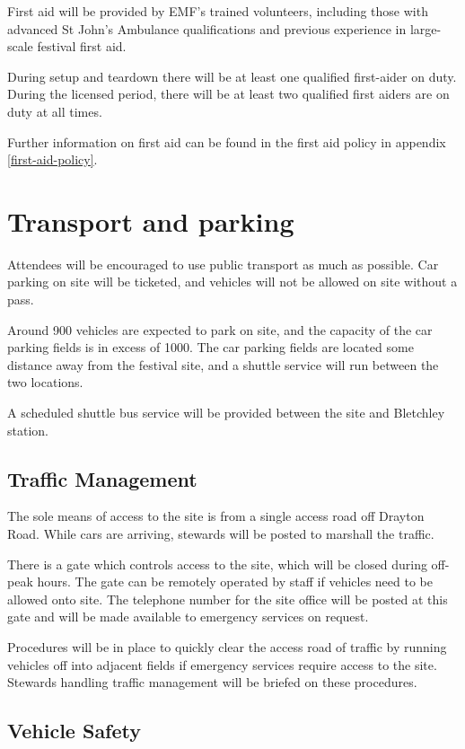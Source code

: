 First aid will be provided by EMF's trained volunteers, including those with advanced St John's Ambulance
qualifications and previous experience in large-scale festival first aid.

During setup and teardown there will be at least one qualified first-aider on duty. During the licensed period, there will be at least two qualified first aiders are on duty at all times.

Further information on first aid can be found in the first aid policy in appendix \ref{first-aid-policy}.

\section{Transport and parking}

Attendees will be encouraged to use public transport as much as possible. Car parking on site will be ticketed,
and vehicles will not be allowed on site without a pass.

Around 900 vehicles are expected to park on site, and the capacity of the car parking fields is in excess of 1000.
The car parking fields are located some distance away from the festival site, and a shuttle service will run between
the two locations.

A scheduled shuttle bus service will be provided between the site and Bletchley station.

\subsection{Traffic Management}

The sole means of access to the site is from a single access road off Drayton Road. While cars are arriving, stewards will be posted to marshall the traffic.

There is a gate which controls access to the site, which will be closed during off-peak hours. The gate can be remotely operated by staff if vehicles need to be allowed onto site. The telephone number for the site office will be posted at this gate and will be made available to emergency services on request.

Procedures will be in place to quickly clear the access road of traffic by running vehicles off into adjacent fields if emergency services require access to the site. Stewards handling traffic management will be briefed on these procedures.

\subsection{Vehicle Safety}

